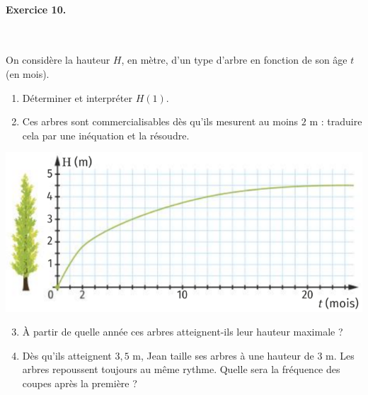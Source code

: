 \documentclass[11pt]{article}
\begin{document}
\paragraph{Exercice 10.}~\\[2mm]
\begin{minipage}{.5\textwidth}
  On considère la hauteur $H$, en mètre, d'un type d'arbre en fonction de son
  \^age $t$ (en mois).
  \begin{enumerate}
    \item Déterminer et interpréter $H(1)$.
    \item Ces arbres sont commercialisables dès qu'ils mesurent au moins $2$ m :
      traduire cela par une inéquation et la résoudre.
  \end{enumerate}
\end{minipage}
\begin{minipage}{.5\textwidth}
  \begin{center}
    \includegraphics[scale=.35]{arbres.png}
  \end{center}
\end{minipage}
\begin{enumerate}
    \setcounter{enumi}{2}
  \item À partir de quelle année ces arbres atteignent-ils leur hauteur maximale
    ?
  \item Dès qu'ils atteignent $3,5$ m, Jean taille ses arbres à une hauteur de
    $3$ m. Les arbres repoussent toujours au même rythme. Quelle sera la
    fréquence des coupes après la première ?
\end{enumerate}
\end{document}
